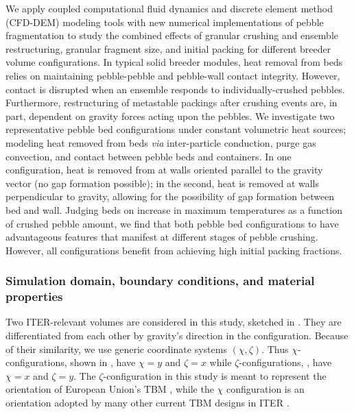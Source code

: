 We apply coupled computational fluid dynamics and discrete element method (CFD-DEM) modeling tools with new numerical implementations of pebble fragmentation to study the combined effects of granular crushing and ensemble restructuring, granular fragment size, and initial packing for different breeder volume configurations. In typical solid breeder modules, heat removal from beds relies on maintaining pebble-pebble and pebble-wall contact integrity. However, contact is disrupted when an ensemble responds to individually-crushed pebbles. Furthermore, restructuring of metastable packings after crushing events are, in part, dependent on gravity forces acting upon the pebbles. We investigate two representative pebble bed configurations under constant volumetric heat sources; modeling heat removed from beds \textit{via} inter-particle conduction, purge gas convection, and contact between pebble beds and containers. In one configuration, heat is removed from at walls oriented parallel to the gravity vector (no gap formation possible); in the second, heat is removed at walls perpendicular to gravity, allowing for the possibility of gap formation between bed and wall. Judging beds on increase in maximum temperatures as a function of crushed pebble amount, we find that both pebble bed configurations to have advantageous features that manifest at different stages of pebble crushing. However, all configurations benefit from achieving high initial packing fractions.



\subsubsection{Simulation domain, boundary conditions, and material properties}

Two ITER-relevant volumes are considered in this study, sketched in . They are differentiated from each other by gravity's direction in the configuration. Because of their similarity, we use generic coordinate systems $(\chi, \zeta)$. Thus $\chi$-configurations, shown in , have $\chi = y$ and $\zeta = x$ while $\zeta$-configurations, , have $\chi = x$ and $\zeta = y$. The $\zeta$-configuration in this study is meant to represent the orientation of European Union's TBM \cite{Hernandez2013}, while the $\chi$ configuration is an orientation adopted by many other current TBM designs in ITER \cite{Cho2008,Feng2012a}.

